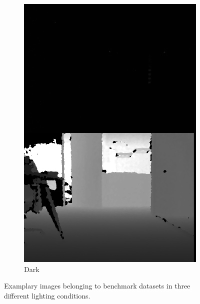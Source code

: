 \documentclass[]{spie}  %
\begin{document}
\begin{figure}
\begin{subfigure}[b]{0.27\textwidth}
        \includegraphics[trim = 0mm 0mm 0mm 0mm, clip, width=\textwidth]{figures/dataset_dark.png}    
        \caption{Dark}
        \label{subfig:dataset_dark}
        \end{subfigure}
        
        \hspace{-2mm}
        \caption{Examplary images belonging to benchmark datasets in three different lighting conditions.}
        \label{fig:dataset}
\end{figure}

\end{document}
